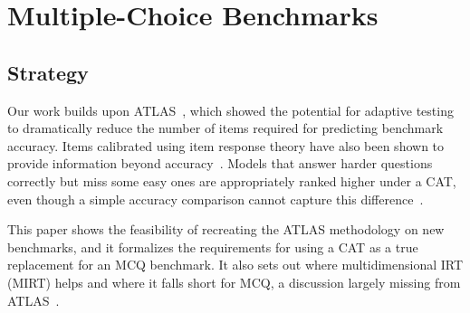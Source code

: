 

\section{Multiple-Choice Benchmarks}

\subsection{Strategy}


Our work builds upon ATLAS~\cite{li2025atlas}, which showed the potential for
adaptive testing to dramatically reduce the number of items required for
predicting benchmark accuracy. Items calibrated using item response theory have
also been shown to provide information beyond
accuracy~\cite{lalor2016, rodriguez2021, vania2021}. Models that answer harder
questions correctly but miss some easy ones are appropriately ranked higher
under a CAT, even though a simple accuracy comparison cannot capture this
difference~\cite{li2025atlas}.

This paper shows the feasibility of recreating the ATLAS methodology on new
benchmarks, and it formalizes the requirements for using a CAT as a true
replacement for an MCQ benchmark. It also sets out where multidimensional IRT
(MIRT) helps and where it falls short for MCQ, a discussion largely missing
from ATLAS~\cite{li2025atlas}.
